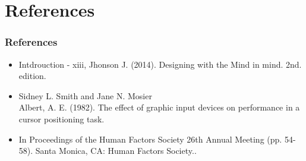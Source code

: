 \documentclass[11pt]{beamer}
\begin{document}
\section{References}
\begin{frame}
\frametitle{References}
\begin{itemize}
\item Intdrouction - xiii, Jhonson J. (2014). Designing with the Mind in mind. 2nd. edition.
\item Sidney L. Smith and Jane N. Mosier \\
Albert, A. E. (1982). The effect of graphic input devices on performance in a cursor positioning task. 

\item In Proceedings of the Human Factors Society 26th Annual Meeting (pp. 54-58). Santa Monica, CA: Human Factors Society..
\end{itemize}
\end{frame}
\end{document}
